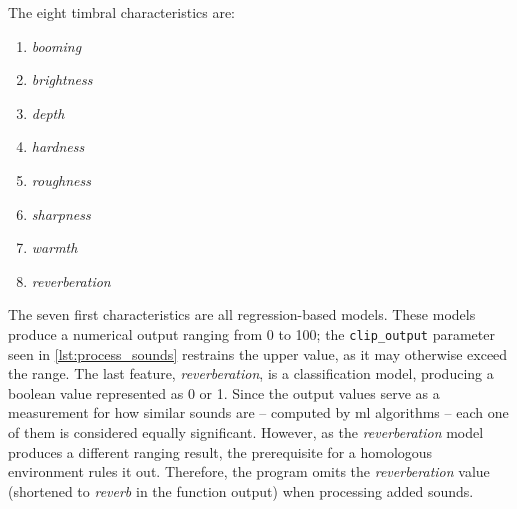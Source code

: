 The eight timbral characteristics are:
\begin{enumerate}
    \item \emph{booming}
    \item \emph{brightness}
    \item \emph{depth}
    \item \emph{hardness}
    \item \emph{roughness}
    \item \emph{sharpness}
    \item \emph{warmth}
    \item \emph{reverberation}
\end{enumerate}
The seven first characteristics are all regression-based models. These models produce a numerical output ranging from 0 to 100; the \texttt{clip\_output} parameter seen in \cref{lst:process_sounds} restrains the upper value, as it may otherwise exceed the range. The last feature, \emph{reverberation}, is a classification model, producing a boolean value represented as 0 or 1.
Since the output values serve as a measurement for how similar sounds are – computed by \gls{ml} algorithms – each one of them is considered equally significant. However, as the \emph{reverberation} model produces a different ranging result, the prerequisite for a homologous environment rules it out. Therefore, the program omits the \emph{reverberation} value (shortened to \emph{reverb} in the function output) when processing added sounds.
\begin{mdframed}[style=code]
    
\end{mdframed}

